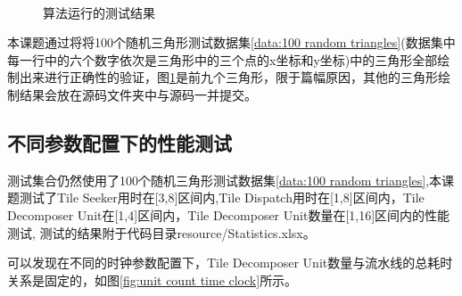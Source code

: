 \begin{figure}[H]
{    }
    \\

    \caption{算法运行的测试结果}
    \label{fig:9 test results}
\end{figure}
本课题通过将将100个随机三角形测试数据集\ref{data:100 random triangles}(数据集中每一行中的六个数字依次是三角形中的三个点的x坐标和y坐标)中的三角形全部绘制出来进行正确性的验证，图\ref{fig:9 test results}是前九个三角形，限于篇幅原因，其他的三角形绘制结果会放在源码文件夹中与源码一并提交。



\subsection{不同参数配置下的性能测试}


测试集合仍然使用了100个随机三角形测试数据集\ref{data:100 random triangles},本课题测试了Tile Seeker用时在[3,8]区间内,Tile Dispatch用时在[1,8]区间内，Tile Decomposer Unit在[1,4]区间内，Tile Decomposer Unit数量在[1,16]区间内的性能测试, 测试的结果附于代码目录resource/Statistics.xlsx。

可以发现在不同的时钟参数配置下，Tile Decomposer Unit数量与流水线的总耗时关系是固定的，如图\ref{fig:unit count time clock}所示。

